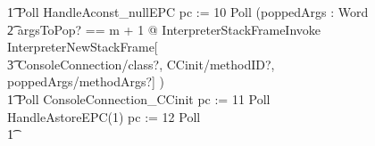 \begin{figure}[p!]
\begin{circus}
    \t1 Poll \circseq HandleAconst\_nullEPC \circseq pc := 10 \circseq Poll \circseq (\circvar poppedArgs : \seq Word \circspot \\
    \t2 \lschexpract \exists argsToPop? == m + 1 @ InterpreterStackFrameInvoke \rschexpract \circseq \lschexpract InterpreterNewStackFrame[\\
    \t3 ConsoleConnection/class?, CCinit/methodID?, poppedArgs/methodArgs?] \rschexpract) \circseq \\
    \t1 Poll \circseq ConsoleConnection\_CCinit \circseq pc := 11 \circseq Poll \circseq HandleAstoreEPC(1) \circseq pc := 12 \circseq Poll \circseq \\
    \t1 {} \cdots {} \\

\end{circus}
\end{figure}
